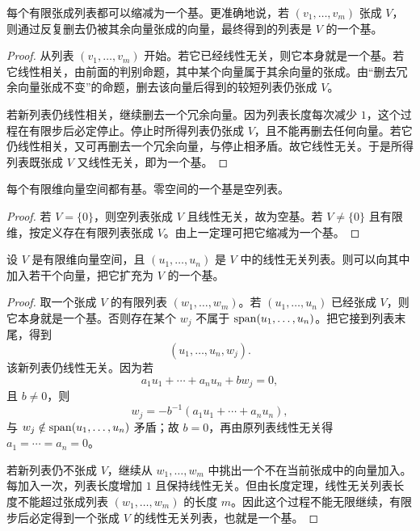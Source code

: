 \begin{theorem} 每个有限张成列表都可以缩减为一个基。更准确地说，若 $(v_1,\dots,v_m)$ 张成 $V$，则通过反复删去仍被其余向量张成的向量，最终得到的列表是 $V$ 的一个基。
\end{theorem}

\begin{proof} 从列表 $(v_1,\dots,v_m)$ 开始。若它已经线性无关，则它本身就是一个基。若它线性相关，由前面的判别命题，其中某个向量属于其余向量的张成。由“删去冗余向量张成不变”的命题，删去该向量后得到的较短列表仍张成 $V$。

若新列表仍线性相关，继续删去一个冗余向量。因为列表长度每次减少 $1$，这个过程在有限步后必定停止。停止时所得列表仍张成 $V$，且不能再删去任何向量。若它仍线性相关，又可再删去一个冗余向量，与停止相矛盾。故它线性无关。于是所得列表既张成 $V$ 又线性无关，即为一个基。
\end{proof}

\begin{corollary} 每个有限维向量空间都有基。零空间的一个基是空列表。
\end{corollary}

\begin{proof} 若 $V=\{0\}$，则空列表张成 $V$ 且线性无关，故为空基。若 $V\neq\{0\}$ 且有限维，按定义存在有限列表张成 $V$。由上一定理可把它缩减为一个基。
\end{proof}

\begin{theorem} 设 $V$ 是有限维向量空间，且 $(u_1,\dots,u_n)$ 是 $V$ 中的线性无关列表。则可以向其中加入若干个向量，把它扩充为 $V$ 的一个基。
\end{theorem}

\begin{proof} 取一个张成 $V$ 的有限列表 $(w_1,\dots,w_m)$。若 $(u_1,\dots,u_n)$ 已经张成 $V$，则它本身就是一个基。否则存在某个 $w_j$ 不属于 $\operatorname{span}(u_1,\dots,u_n)$。把它接到列表末尾，得到
\[ (u_1,\dots,u_n,w_j). \]
该新列表仍线性无关。因为若
\[ a_1u_1+\cdots+a_nu_n+bw_j=0, \]
且 $b\neq 0$，则
\[ w_j=-b^{-1}(a_1u_1+\cdots+a_nu_n), \]
与 $w_j\notin\operatorname{span}(u_1,\dots,u_n)$ 矛盾；故 $b=0$，再由原列表线性无关得 $a_1=\cdots=a_n=0$。

若新列表仍不张成 $V$，继续从 $w_1,\dots,w_m$ 中挑出一个不在当前张成中的向量加入。每加入一次，列表长度增加 $1$ 且保持线性无关。但由长度定理，线性无关列表长度不能超过张成列表 $(w_1,\dots,w_m)$ 的长度 $m$。因此这个过程不能无限继续，有限步后必定得到一个张成 $V$ 的线性无关列表，也就是一个基。
\end{proof}

